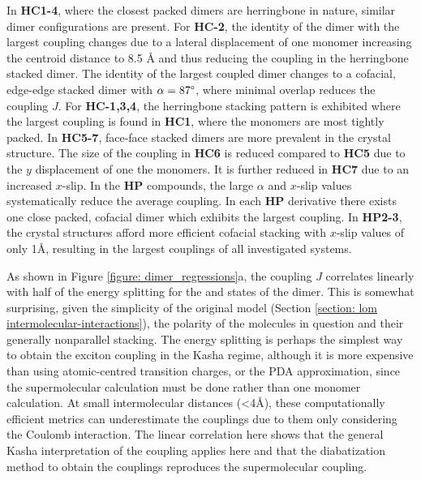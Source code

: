 In \textbf{HC1-4}, where the closest packed dimers are herringbone in nature, similar dimer configurations are present. For \textbf{HC-2}, the identity of the dimer with the largest coupling changes due to a lateral displacement of one monomer increasing the centroid distance to 8.5 {\AA} and thus reducing the coupling in the herringbone stacked dimer. The identity of the largest coupled dimer changes to a cofacial, edge-edge stacked dimer with $\alpha=87\degree$, where minimal overlap reduces the coupling $J$. For \textbf{HC-1,3,4}, the herringbone stacking pattern is exhibited where the largest coupling is found in \textbf{HC1}, where the monomers are most tightly packed. In \textbf{HC5-7}, face-face stacked dimers are more prevalent in the crystal structure. The size of the coupling in \textbf{HC6} is reduced compared to \textbf{HC5} due to the $y$ displacement of one the monomers. It is further reduced in \textbf{HC7} due to an increased $x$-slip. In the \textbf{HP} compounds, the large $\alpha$ and $x$-slip values systematically reduce the average coupling. In each \textbf{HP} derivative there exists one close packed, cofacial dimer which exhibits the largest coupling. In \textbf{HP2-3}, the crystal structures afford more efficient cofacial stacking with $x$-slip values of only 1{\AA}, resulting in the largest couplings of all investigated systems. 

As shown in  Figure \ref{figure: dimer_regressions}a, the coupling $J$ correlates linearly with half of the energy splitting for the \sone{} and \stwo{} states of the dimer. This is somewhat surprising, given the simplicity of the original model (Section \ref{section: lom intermolecular-interactions}), the polarity of the molecules in question and their generally nonparallel stacking. The energy splitting is perhaps the simplest way to obtain the exciton coupling in the Kasha regime, although it is more expensive than using atomic-centred transition charges, or the PDA approximation, since the supermolecular calculation must be done rather than one monomer calculation. At small intermolecular distances (\textless4{\AA}), these computationally efficient metrics can underestimate the couplings due to them only considering the Coulomb interaction.\cite{Kistler2013} The linear correlation here shows that the general Kasha interpretation of the coupling applies here and that the diabatization method to obtain the couplings reproduces the supermolecular coupling.

